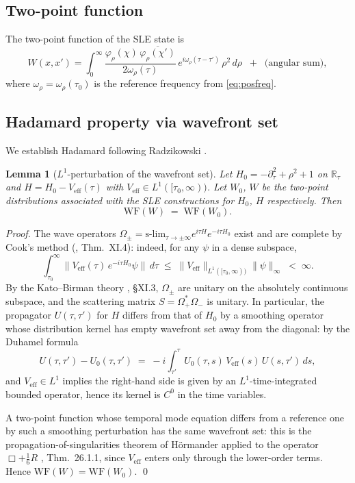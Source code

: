 \documentclass[12pt,letterpaper]{article}
\newtheorem{lemma}[theorem]{Lemma}
\newcommand{\Rbb}{\mathbb{R}}
\newcommand{\WF}{\mathrm{WF}}
\begin{document}
\subsection{Two-point function}

The two-point function of the SLE state is
\begin{equation}
  W(x,x') = \int_0^\infty
  \frac{\varphi_\rho(\chi)\,\overline{\varphi_\rho(\chi')}}{2\omega_\rho(\tau)}
  \,e^{i\omega_\rho(\tau-\tau')}\,\rho^2\,d\rho
  \;\;+\;\;
  \text{(angular sum)},
  \label{eq:2pt}
\end{equation}
where $\omega_\rho = \omega_\rho(\tau_0)$ is the reference frequency
from \eqref{eq:posfreq}.

\subsection{Hadamard property via wavefront set}

We establish Hadamard following Radzikowski \cite{Radzikowski96}.

\begin{lemma}[$L^{1}$-perturbation of the wavefront set]
\label{lem:WFL1}
Let $H_{0}=-\partial_{\tau}^{2}+\rho^{2}+1$ on $\Rbb_{\tau}$ and
$H=H_{0}-V_{\mathrm{eff}}(\tau)$ with $V_{\mathrm{eff}}\in
L^{1}([\tau_{0},\infty))$.  Let $W_{0}$, $W$ be the two-point
distributions associated with the SLE constructions for $H_{0}$,
$H$ respectively.  Then
\[
  \WF(W)\;=\;\WF(W_{0}).
\]
\end{lemma}
\begin{proof}
The wave operators
$\Omega_{\pm}=\mathrm{s\text{-}lim}_{\tau\to\pm\infty}
e^{i\tau H}e^{-i\tau H_{0}}$
exist and are complete by Cook's method (\cite{ReedSimonIII}, Thm.~XI.4):
indeed, for any $\psi$ in a dense subspace,
\[
  \int_{\tau_{0}}^{\infty}\!\bigl\|V_{\mathrm{eff}}(\tau)\,
  e^{-i\tau H_{0}}\psi\bigr\|\,d\tau
  \;\le\;\|V_{\mathrm{eff}}\|_{L^{1}([\tau_{0},\infty))}\|\psi\|_{\infty}
  \;<\;\infty.
\]
By the Kato--Birman theory \cite{ReedSimonIII}, \S XI.3,
$\Omega_{\pm}$ are unitary on the absolutely continuous subspace, and
the scattering matrix $S=\Omega_{+}^{*}\Omega_{-}$ is unitary.  In
particular, the propagator $U(\tau,\tau')$ for $H$ differs from that
of $H_{0}$ by a smoothing operator whose distribution kernel has empty
wavefront set away from the diagonal: by the Duhamel formula
\[
  U(\tau,\tau')-U_{0}(\tau,\tau')
  \;=\;-i\int_{\tau'}^{\tau}\!U_{0}(\tau,s)\,V_{\mathrm{eff}}(s)\,U(s,\tau')\,ds,
\]
and $V_{\mathrm{eff}}\in L^{1}$ implies the right-hand side is given
by an $L^{1}$-time-integrated bounded operator, hence its kernel is
$C^{0}$ in the time variables.

A two-point function whose temporal mode equation differs from a
reference one by such a smoothing perturbation has the same wavefront
set: this is the propagation-of-singularities theorem of
H\"{o}rmander applied to the operator $\Box+\tfrac{1}{6}R$
\cite{Hormander85}, Thm.~26.1.1, since
$V_{\mathrm{eff}}$ enters only through the lower-order terms.
Hence $\WF(W)=\WF(W_{0})$.
\qed
\end{proof}
\end{document}
